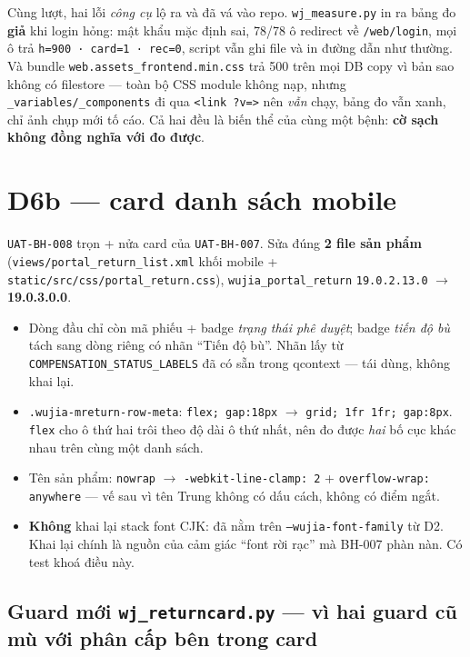 Cùng lượt, hai lỗi \emph{công cụ} lộ ra và đã vá vào repo. \texttt{wj\_measure.py} in ra bảng đo
\textbf{giả} khi login hỏng: mật khẩu mặc định sai, 78/78 ô redirect về \texttt{/web/login}, mọi ô
trả \texttt{h=900 · card=1 · rec=0}, script vẫn ghi file và in đường dẫn như thường. Và bundle
\texttt{web.assets\_frontend.min.css} trả 500 trên mọi DB copy vì bản sao không có filestore ---
toàn bộ CSS module không nạp, nhưng \texttt{\_variables/\_components} đi qua \texttt{<link ?v=>}
nên \emph{vẫn} chạy, bảng đo vẫn xanh, chỉ ảnh chụp mới tố cáo. Cả hai đều là biến thể của cùng
một bệnh: \textbf{cờ sạch không đồng nghĩa với đo được}.

\section{D6b --- card danh sách mobile}

\texttt{UAT-BH-008} trọn + nửa card của \texttt{UAT-BH-007}. Sửa đúng \textbf{2 file sản phẩm}
(\texttt{views/portal\_return\_list.xml} khối mobile + \texttt{static/src/css/portal\_return.css}),
\texttt{wujia\_portal\_return} \texttt{19.0.2.13.0} $\to$ \textbf{19.0.3.0.0}.

\begin{itemize}
\item Dòng đầu chỉ còn mã phiếu + badge \emph{trạng thái phê duyệt}; badge \emph{tiến độ bù} tách
  sang dòng riêng có nhãn ``Tiến độ bù''. Nhãn lấy từ \texttt{COMPENSATION\_STATUS\_LABELS} đã có
  sẵn trong qcontext --- tái dùng, không khai lại.
\item \texttt{.wujia-mreturn-row-meta}: \texttt{flex; gap:18px} $\to$ \texttt{grid; 1fr 1fr; gap:8px}.
  \texttt{flex} cho ô thứ hai trôi theo độ dài ô thứ nhất, nên đo được \emph{hai} bố cục khác nhau
  trên cùng một danh sách.
\item Tên sản phẩm: \texttt{nowrap} $\to$ \texttt{-webkit-line-clamp: 2} +
  \texttt{overflow-wrap: anywhere} --- vế sau vì tên Trung không có dấu cách, không có điểm ngắt.
\item \textbf{Không} khai lại stack font CJK: đã nằm trên \texttt{--wujia-font-family} từ D2. Khai
  lại chính là nguồn của cảm giác ``font rời rạc'' mà BH-007 phàn nàn. Có test khoá điều này.
\end{itemize}

\subsection*{Guard mới \texttt{wj\_returncard.py} --- vì hai guard cũ mù với phân cấp bên trong card}

